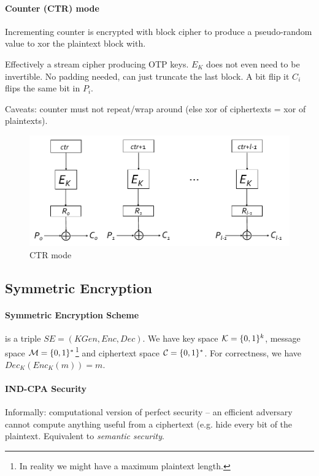 \paragraph{Counter (CTR) mode}
Incrementing counter is encrypted with block cipher to produce a pseudo-random value to xor the plaintext block with.

Effectively a stream cipher producing OTP keys.
$E_K$ does not even need to be invertible.
No padding needed, can just truncate the last block.
A bit flip it $C_i$ flips the same bit in $P_i$.

Caveats: counter must not repeat/wrap around (else xor of ciphertexts = xor of plaintexts).

\begin{figure}[h]
    \centering
	\includegraphics[scale=0.4]{images/ctr.png}
    \caption{CTR mode}
    \label{fig:ctr}
\end{figure}


\subsection{Symmetric Encryption}

\paragraph{Symmetric Encryption Scheme}
is a triple $ SE = (KGen, Enc, Dec) $.
We have key space $\mathcal{K} = \lbrace 0, 1 \rbrace^k$, message space $\mathcal{M} = \lbrace 0, 1 \rbrace^*$\footnote{In reality we might have a maximum plaintext length.} and ciphertext space $\mathcal{C} = \lbrace 0, 1 \rbrace^*$.
For correctness, we have $ Dec_K(Enc_K(m))=m $.

\paragraph{IND-CPA Security}
Informally:
computational version of perfect security --
an efficient adversary cannot compute anything useful from a ciphertext (e.g. hide every bit of the plaintext.
Equivalent to \emph{semantic security}.

